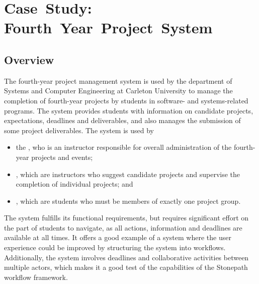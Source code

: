 \documentclass[document.tex]{subfiles}
\begin{document}
\chapter{Case~Study: Fourth~Year~Project~System}
\label {ch:case-study-1}


\section {Overview}

The fourth-year project management system is used by the department of Systems and Computer Engineering at Carleton University to manage the completion of fourth-year projects by students in software- and systems-related programs. The system provides students with information on candidate projects, expectations, deadlines and deliverables, and also manages the submission of some project deliverables. The system is used by
\begin{itemize}
\item the , who is an instructor responsible for overall administration of the fourth-year projects and events;
\item {}, which are instructors who suggest candidate projects and supervise the completion of individual projects; and
\item {}, which are students who must be members of exactly one project group.
\end{itemize}

The system fulfills its functional requirements, but requires significant effort on the part of students to navigate, as all actions, information and deadlines are available at all times. It offers a good example of a system where the user experience could be improved by structuring the system into workflows. Additionally, the system involves deadlines and collaborative activities between multiple actors, which makes it a good test of the capabilities of the Stonepath workflow framework.

\end{document}
